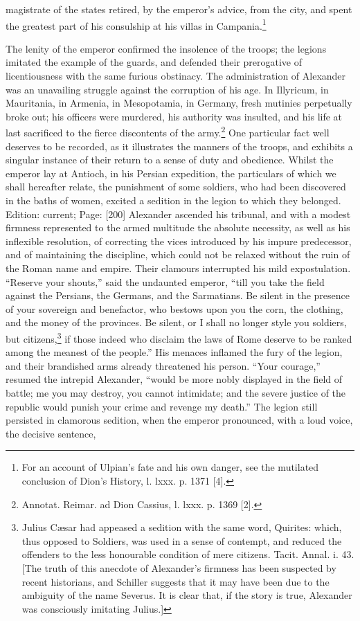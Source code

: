 magistrate of the states retired, by the emperor\texthebrew{}’s advice, from the city, and spent the greatest part of his consulship at his villas in Campania.\footnote{For an account of Ulpian\texthebrew{}’s fate and his own danger, see the mutilated conclusion of Dion\texthebrew{}’s History, l. lxxx. p. 1371 [4].}

The lenity of the emperor confirmed the insolence of the troops; the legions imitated the example of the guards, and defended their prerogative of licentiousness with the same furious obstinacy. The administration of Alexander was an unavailing struggle against the corruption of his age. In Illyricum, in Mauritania, in Armenia, in Mesopotamia, in Germany, fresh mutinies perpetually broke out; his officers were murdered, his authority was insulted, and his life at last sacrificed to the fierce discontents of the army.\footnote{Annotat. Reimar. ad Dion Cassius, l. lxxx. p. 1369 [2].} One particular fact well deserves to be recorded, as it illustrates the manners of the troops, and exhibits a singular instance of their return to a sense of duty and obedience. Whilst the emperor lay at Antioch, in his Persian expedition, the particulars of which we shall hereafter relate, the punishment of some soldiers, who had been discovered in the baths of women, excited a sedition in the legion to which they belonged. Edition: current; Page: [200] Alexander ascended his tribunal, and with a modest firmness represented to the armed multitude the absolute necessity, as well as his inflexible resolution, of correcting the vices introduced by his impure predecessor, and of maintaining the discipline, which could not be relaxed without the ruin of the Roman name and empire. Their clamours interrupted his mild expostulation. \texthebrew{“}Reserve your shouts,\texthebrew{}” said the undaunted emperor, \texthebrew{“}till you take the field against the Persians, the Germans, and the Sarmatians. Be silent in the presence of your sovereign and benefactor, who bestows upon you the corn, the clothing, and the money of the provinces. Be silent, or I shall no longer style you soldiers, but citizens,\footnote{Julius Cæsar had appeased a sedition with the same word, Quirites: which, thus opposed to Soldiers, was used in a sense of contempt, and reduced the offenders to the less honourable condition of mere citizens. Tacit. Annal. i. 43. [The truth of this anecdote of Alexander\texthebrew{}’s firmness has been suspected by recent historians, and Schiller suggests that it may have been due to the ambiguity of the name Severus. It is clear that, if the story is true, Alexander was consciously imitating Julius.]} if those indeed who disclaim the laws of Rome deserve to be ranked among the meanest of the people.\texthebrew{}” His menaces inflamed the fury of the legion, and their brandished arms already threatened his person. \texthebrew{“}Your courage,\texthebrew{}” resumed the intrepid Alexander, \texthebrew{“}would be more nobly displayed in the field of battle; me you may destroy, you cannot intimidate; and the severe justice of the republic would punish your crime and revenge my death.\texthebrew{}” The legion still persisted in clamorous sedition, when the emperor pronounced, with a loud voice, the decisive sentence, 